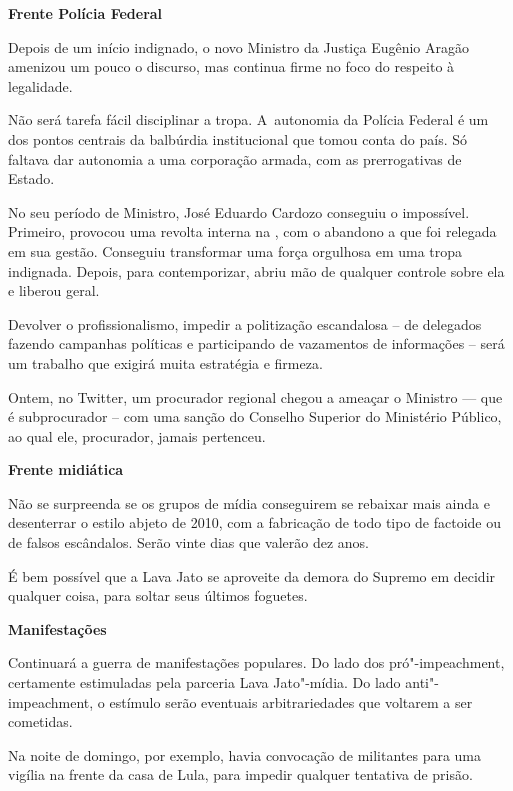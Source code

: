 \textbf{Frente Polícia Federal}

Depois de um início indignado, o novo Ministro da Justiça Eugênio Aragão
amenizou um pouco o discurso, mas continua firme no foco do respeito à
legalidade.

Não será tarefa fácil disciplinar a tropa. A~autonomia da Polícia
Federal é um dos pontos centrais da balbúrdia institucional que tomou
conta do país. Só faltava dar autonomia a uma corporação armada, com as
prerrogativas de Estado.

No seu período de Ministro, José Eduardo Cardozo conseguiu o impossível.
Primeiro, provocou uma revolta interna na , com o abandono a que foi
relegada em sua gestão. Conseguiu transformar uma força orgulhosa em uma
tropa indignada. Depois, para contemporizar, abriu mão de qualquer
controle sobre ela e liberou geral.

Devolver o profissionalismo, impedir a politização escandalosa -- de
delegados fazendo campanhas políticas e participando de vazamentos de
informações -- será um trabalho que exigirá muita estratégia e firmeza.

Ontem, no Twitter, um procurador regional chegou a ameaçar o Ministro
--- que é subprocurador -- com uma sanção do Conselho Superior do
Ministério Público, ao qual ele, procurador, jamais pertenceu.

\textbf{Frente midiática}

Não se surpreenda se os grupos de mídia conseguirem se rebaixar mais
ainda e desenterrar o estilo abjeto de 2010, com a fabricação de todo
tipo de factoide ou de falsos escândalos. Serão vinte dias que valerão
dez anos.

É bem possível que a Lava Jato se aproveite da demora do Supremo em
decidir qualquer coisa, para soltar seus últimos foguetes.

\textbf{Manifestações}

Continuará a guerra de manifestações populares. Do lado dos
pró"-impeachment, certamente estimuladas pela parceria Lava Jato"-mídia.
Do lado anti"-impeachment, o estímulo serão eventuais arbitrariedades que
voltarem a ser cometidas.

Na noite de domingo, por exemplo, havia convocação de militantes para
uma vigília na frente da casa de Lula, para impedir qualquer tentativa
de prisão.
